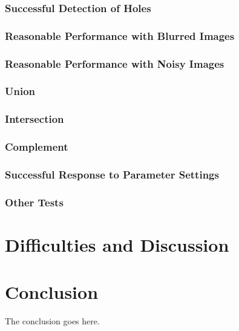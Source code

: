 \documentclass[10pt,journal,letterpaper,compsoc]{IEEEtran}
\begin{document}
\subsubsection*{Successful Detection of Holes}

\subsubsection*{Reasonable Performance with Blurred Images}

\subsubsection*{Reasonable Performance with Noisy Images}

\subsubsection*{Union}

\subsubsection*{Intersection}

\subsubsection*{Complement}

\subsubsection*{Successful Response to Parameter Settings}

\subsubsection*{Other Tests}

\section{Difficulties and Discussion}
\label{sec:difficulties}

\section{Conclusion}
\label{sec:concl}
The conclusion goes here.










\end{document}
